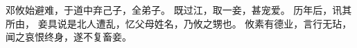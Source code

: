 
\switchcolumn*[\section{}]

邓攸始避难，于道中弃己子，全弟子。
既过江，取一妾，甚宠爱。
历年后，讯其所由，
妾具说是北人遭乱，忆父母姓名，乃攸之甥也。
攸素有德业，言行无玷，闻之哀恨终身，遂不复畜妾。

\switchcolumn



